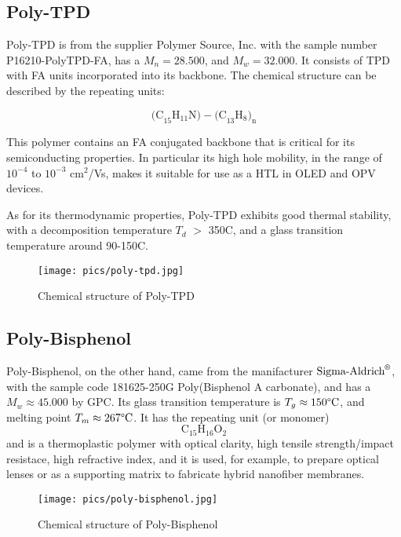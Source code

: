\subsection{Poly-TPD}
Poly-TPD is from the supplier Polymer Source, Inc.{\texttrademark}  with the sample number P16210-PolyTPD-FA, has a $M_n = 28.500$, and $M_w = 32.000$. It consists of \ac{TPD} with \ac{FA} units incorporated into its backbone. The chemical structure can be described by the repeating units:

\[
\text{(C}_{15}\text{H}_{11}\text{N)}-\text{(C}_{13}\text{H}_{8}\text{)}_{\text{n}}
\]

This polymer contains an FA conjugated backbone that is critical for its semiconducting properties. In particular its high hole mobility, in the range of $10^{-4}$ to $10^{-3}$ cm$^2$/Vs, makes it suitable for use as a \ac{HTL} in \ac{OLED} and \ac{OPV} devices.

As for its thermodynamic properties, Poly-TPD exhibits good thermal stability, with a decomposition temperature $T_d$ $>$ 350\degree C, and a glass transition temperature around 90-150\degree C. %


\begin{figure}[htp!]
    \centering
    \hspace*{-0.8cm}
    \texttt{[image: pics/poly-tpd.jpg]}
    \caption{Chemical structure of Poly-TPD}
    \label{Chemical structure of Poly-TPD}
\end{figure}

\subsection{Poly-Bisphenol}
Poly-Bisphenol, on the other hand, came from the manifacturer $\text{Sigma-Aldrich}^{\text{\textregistered}}$, with the sample code 181625-250G Poly(Bisphenol A carbonate), and has a $M_w \approx 45.000$ by \ac{GPC}. Its glass transition temperature is $T_g \approx 150 \degree \text{C}$, and melting point $T_m \approx 267 \degree \text{C}$. %
It has the repeating unit (or monomer)
\[
\text{C}_{15}\text{H}_{16}\text{O}_{2}
\]
and is a thermoplastic polymer with optical clarity, high tensile strength/impact resistace, high refractive index, and it is used, for example, to prepare optical lenses or as a supporting matrix to fabricate hybrid nanofiber membranes.

\begin{figure}[htp!]
    \centering
    \hspace*{-0.8cm}
    \texttt{[image: pics/poly-bisphenol.jpg]}
    \caption{Chemical structure of Poly-Bisphenol}
    \label{Chemical structure of Poly-Bisphenol}
\end{figure}



